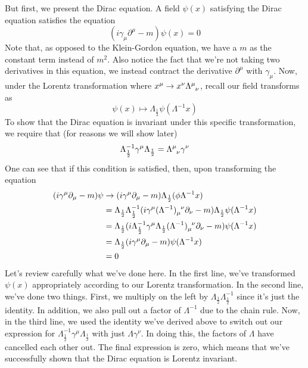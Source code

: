 \documentclass[11pt, oneside]{article}   	%
\theoremstyle{newline}
\theoremstyle{newline}
\theoremstyle{newline}
\theoremstyle{newline}
\theoremstyle{newline}
\begin{document}
But first, we present the Dirac equation. A field $\psi(x)$ satisfying the Dirac equation satisfies the equation \[ ( i \gamma_\mu \partial^\mu  - m ) \psi( x) = 0  \]
Note that, as opposed to the Klein-Gordon equation, we have a $m$ as the constant term instead of $m^2$. Also notice the fact that we're not taking two derivatives in this equation, we instead contract the derivative $\partial^\mu$ with $\gamma_\mu$. Now, under the Lorentz transformation where $x^\mu \rightarrow x^\nu \Lambda\indices{^\mu_\nu} $, recall our field transforms as \[ 
\psi(x)  \mapsto \Lambda_{ \frac{ 1 }{2 }} \psi( \Lambda^{ -1} x ) \] 
To show that the Dirac equation is invariant under this specific transformation, we require that (for reasons we will show later) \[ 
\Lambda_{ \frac{ 1}{ 2}}^{ -1} \gamma^\mu \Lambda_{ \frac{ 1}{2}}  = \Lambda\indices{ ^\mu_\nu } \gamma^\nu \] 
One can see that if this condition is satisfied, then, upon transforming the equation
\begin{align*} 
( i \gamma^\mu \partial_\mu  -m) \psi & \rightarrow ( i \gamma^\mu \partial_\mu  - m) \Lambda_{ \frac{ 1}{2} } ( \phi \Lambda^{ -1} x )  \\ 
& = \Lambda_{ \frac{1}{ 2} } \Lambda_{ \frac{1}{2} }^{ -1}  ( i \gamma^\mu ( \Lambda^{-1 })\indices{_\mu^\nu} \partial_\nu  - m ) \Lambda_{ \frac{ 1}{2} } \psi( \Lambda^{-1} x ) \\ 
& = \Lambda_{ \frac{ 1}{ 2} } ( i \Lambda_{ \frac{ 1}{2}}^{ -1} \gamma^\mu \Lambda_{ \frac{ 1}{2} } ( \Lambda^{ -1} )\indices{_\mu^\nu} \partial_\nu - m ) \psi( \Lambda^{ -1} x) \\
&= \Lambda_{ \frac{ 1}{2}} ( i \gamma^\mu \partial_\mu  -m ) \psi( \Lambda^{-1} x)    \\ 
&= 0  
\end{align*} 
Let's review carefully what we've done here. In the first line, we've transformed $\psi( x) $ appropriately according to our Lorentz transformation. In the second line, we've done two things. First, we multiply on the left by $\Lambda_{ \frac{1}{2}} \Lambda_{\frac{1}{2}}^{ -1} $ since it's just the identity. In addition, we also pull out a factor of $\Lambda^{-1} $ due to the chain rule. Now, in the third line, we used the identity we've derived above to switch out our expression for $\Lambda_{ \frac{ 1}{2}}^{ -1}  \gamma^\mu \Lambda_{ \frac{1}{2} } $ with just $\Lambda \gamma^\nu $. In doing this, the factors of $\Lambda $ have cancelled each other out. 
The final expression is zero, which means that we've successfully shown that the Dirac equation is Lorentz invariant. 
\end{document}

